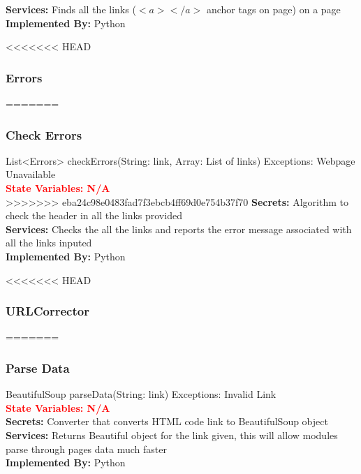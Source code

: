 \documentclass[titlepage]{article}
\begin{document}
{\textbf{Services:}
Finds all the links (${<a></a>}$ anchor tags on page) on a page \\
\textbf{Implemented By:}
Python

<<<<<<< HEAD
\subsubsection{ Errors}

=======
\subsubsection{Check Errors}
List<Errors> checkErrors(String: link, Array: List of links) Exceptions: Webpage Unavailable\\
\textcolor{red}{\textbf{State Variables: N/A}}\\
>>>>>>> eba24c98e0483fad7f3ebcb4ff69d0e754b37f70
\textbf{Secrets:}
Algorithm to check the header in all the links provided \\

\textbf{Services:}
Checks the all the links and reports the error message associated with all the links inputed\\

\textbf{Implemented By:} Python

<<<<<<< HEAD

\subsubsection{URLCorrector}
=======
\subsubsection{Parse Data}
BeautifulSoup parseData(String: link) Exceptions: Invalid Link\\
\textcolor{red}{\textbf{State Variables: N/A}}\\
\textbf{Secrets:}
Converter that converts HTML code link to BeautifulSoup object \\

\textbf{Services:}
Returns Beautiful object for the link given, this will allow modules parse through pages data much faster\\

\textbf{Implemented By:} Python

}
\end{document}
